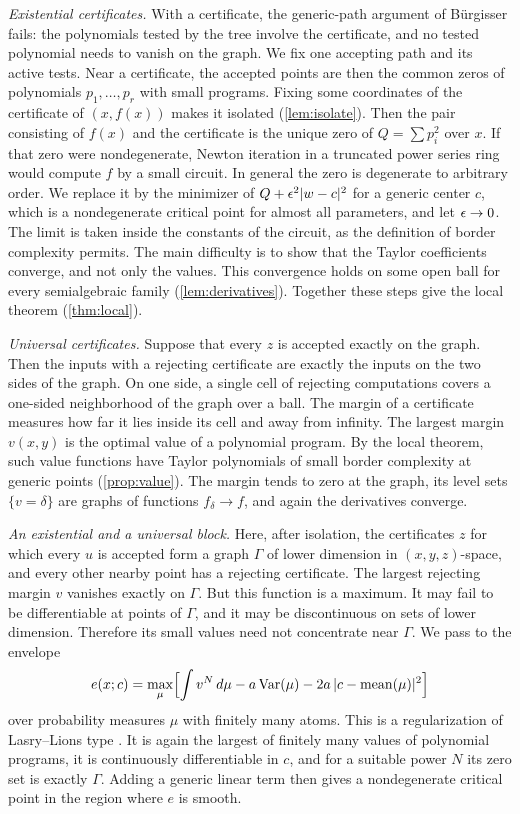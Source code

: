 \emph{Existential certificates.} With a certificate, the generic-path argument of B\"urgisser fails: the polynomials tested by the tree involve the certificate, and no tested polynomial needs to vanish on the graph. We fix one accepting path and its active tests. Near a certificate, the accepted points are then the common zeros of polynomials $p_1,\dots,p_r$ with small programs. Fixing some coordinates of the certificate of $(x,f(x))$ makes it isolated (\cref{lem:isolate}). Then the pair consisting of $f(x)$ and the certificate is the unique zero of $Q=\sum p_i^2$ over $x$. If that zero were nondegenerate, Newton iteration in a truncated power series ring would compute $f$ by a small circuit. In general the zero is degenerate to arbitrary order. We replace it by the minimizer of $Q+\epsilon^2|w-c|^2$ for a generic center $c$, which is a nondegenerate critical point for almost all parameters, and let $\epsilon\to0$. The limit is taken inside the constants of the circuit, as the definition of border complexity permits. The main difficulty is to show that the Taylor coefficients converge, and not only the values. This convergence holds on some open ball for every semialgebraic family (\cref{lem:derivatives}). Together these steps give the local theorem (\cref{thm:local}).

\emph{Universal certificates.} Suppose that every $z$ is accepted exactly on the graph. Then the inputs with a rejecting certificate are exactly the inputs on the two sides of the graph. On one side, a single cell of rejecting computations covers a one-sided neighborhood of the graph over a ball. The margin of a certificate measures how far it lies inside its cell and away from infinity. The largest margin $v(x,y)$ is the optimal value of a polynomial program. By the local theorem, such value functions have Taylor polynomials of small border complexity at generic points (\cref{prop:value}). The margin tends to zero at the graph, its level sets $\{v=\delta\}$ are graphs of functions $f_\delta\to f$, and again the derivatives converge.

\emph{An existential and a universal block.} Here, after isolation, the certificates $z$ for which every $u$ is accepted form a graph $\Gamma$ of lower dimension in $(x,y,z)$-space, and every other nearby point has a rejecting certificate. The largest rejecting margin $v$ vanishes exactly on $\Gamma$. But this function is a maximum. It may fail to be differentiable at points of $\Gamma$, and it may be discontinuous on sets of lower dimension. Therefore its small values need not concentrate near $\Gamma$. We pass to the envelope
\[
e(x;c)=\max_\mu\Bigl[\int v^N\,d\mu-a\operatorname{Var}(\mu)-2a\,|c-\operatorname{mean}(\mu)|^2\Bigr]
\]
over probability measures $\mu$ with finitely many atoms. This is a regularization of Lasry--Lions type \cite{LL86}. It is again the largest of finitely many values of polynomial programs, it is continuously differentiable in $c$, and for a suitable power $N$ its zero set is exactly $\Gamma$. Adding a generic linear term then gives a nondegenerate critical point in the region where $e$ is smooth.

